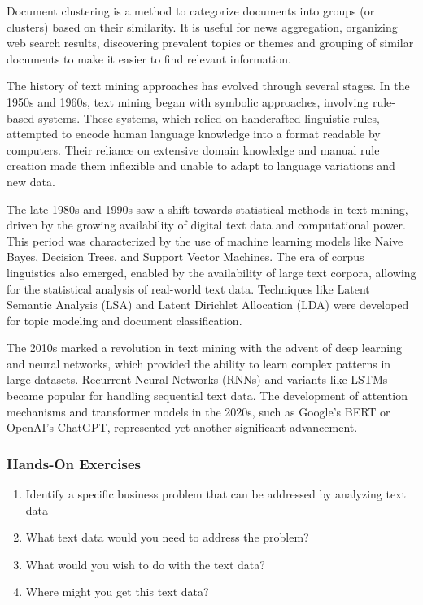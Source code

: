 Document clustering is a method to categorize documents into groups (or clusters) based on their similarity. It is useful for news aggregation, organizing web search results, discovering prevalent topics or themes and grouping of similar documents to make it easier to find relevant information.

The history of text mining approaches has evolved through several stages. In the 1950s and 1960s, text mining began with symbolic approaches, involving rule-based systems. These systems, which relied on handcrafted linguistic rules, attempted to encode human language knowledge into a format readable by computers. Their reliance on extensive domain knowledge and manual rule creation made them inflexible and unable to adapt to language variations and new data.

The late 1980s and 1990s saw a shift towards statistical methods in text mining, driven by the growing availability of digital text data and computational power. This period was characterized by the use of machine learning models like Naive Bayes, Decision Trees, and Support Vector Machines. The era of corpus linguistics also emerged, enabled by the availability of large text corpora, allowing for the statistical analysis of real-world text data. Techniques like Latent Semantic Analysis (LSA) and Latent Dirichlet Allocation (LDA) were developed for topic modeling and document classification. 

The 2010s marked a revolution in text mining with the advent of deep learning and neural networks, which provided the ability to learn complex patterns in large datasets. Recurrent Neural Networks (RNNs) and variants like LSTMs became popular for handling sequential text data. The development of attention mechanisms and transformer models in the 2020s, such as Google's BERT or OpenAI's ChatGPT, represented yet another significant advancement.

\begin{tcolorbox}[colback=code]
\subsubsection*{Hands-On Exercises}
 
\begin{enumerate}
	\item Identify a specific business problem that can be addressed by analyzing text data
	\item What text data would you need to address the problem?
	\item What would you wish to do with the text data?
	\item Where might you get this text data?
\end{enumerate}
\end{tcolorbox}

